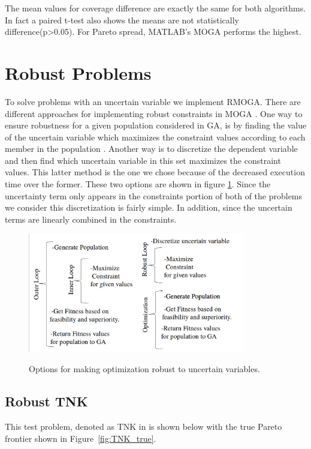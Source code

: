 \documentclass{article}
\begin{document}
\noindent The mean values for coverage difference are exactly the same for both algorithms. In fact a paired t-test also shows the means are not statistically difference(p>0.05). For Pareto spread, MATLAB's MOGA performs the highest.
\newpage
\section{Robust Problems} 
To solve problems with an uncertain variable we implement RMOGA. There are different approaches for implementing robust constraints in MOGA \cite{hu2009improving}\cite{li2006new}. One way to ensure robustness for a given population considered in GA, is by finding the value of the uncertain variable which maximizes the constraint values according to each member in the population .  Another way is to discretize the dependent variable and then find which uncertain variable in this set maximizes the constraint values.  This latter method is the one we chose because of the decreased execution time over the former.  These two options are shown in figure \ref{fig:discretize}.
   Since the uncertainty term only appears in the constraints portion of both of the problems we consider this discretization is fairly simple.  In addition, since the uncertain terms are linearly combined in the constraints.


\begin{figure}[H]
  \caption{Options for making optimization robust to uncertain variables. }
  \centering
  \includegraphics[width=0.85\textwidth]{Robustness.png}  
  \label{fig:discretize}
\end{figure}


 
\subsection{Robust TNK} 
This test problem, denoted as TNK in \cite{deb2001multi} is shown below with the true Pareto frontier shown in Figure~\ref{fig:TNK_true}.
\end{document}
